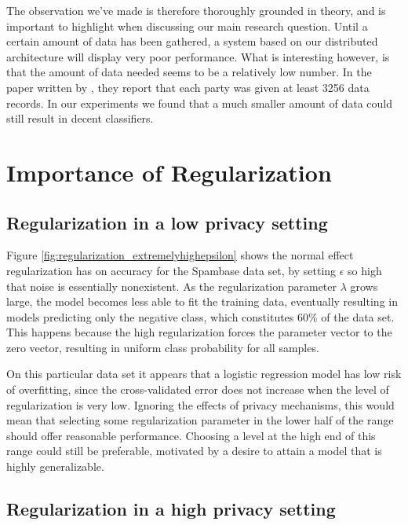 The observation we've made is therefore thoroughly grounded in theory, and is important to highlight when discussing our main research question. Until a certain amount of data has been gathered, a system based on our distributed architecture will display very poor performance. What is interesting however, is that the amount of data needed seems to be a relatively low number. In the paper written by \cite{pathak2010diffprivhomo}, they report that each party was given at least 3256 data records. In our experiments we found that a much smaller amount of data could still result in decent classifiers. 	  	

\section{Importance of Regularization}

\subsection{Regularization in a low privacy setting}
Figure \ref{fig:regularization_extremelyhighepsilon} shows the normal effect regularization has on accuracy for the Spambase data set, by setting $\epsilon$ so high that noise is essentially nonexistent. As the regularization parameter $\lambda$ grows large, the model becomes less able to fit the training data, eventually resulting in models predicting only the negative class, which constitutes 60\% of the data set. This happens because the high regularization forces the parameter vector to the zero vector, resulting in uniform class probability for all samples. 

On this particular data set it appears that a logistic regression model has low risk of overfitting, since the cross-validated error does not increase when the level of regularization is very low. Ignoring the effects of privacy mechanisms, this would mean that selecting some regularization parameter in the lower half of the range should offer reasonable performance. Choosing a level at the high end of this range could still be preferable, motivated by a desire to attain a model that is highly generalizable.

\subsection{Regularization in a high privacy setting}

